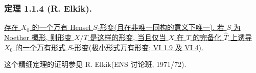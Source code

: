 \subsubsection*{定理 1.1.4 (R. Elkik).}
\underline{存在 $X_0$ 的一个万有 Hensel $S$-形变(且在非唯一同构的意义下唯一). 若 $S$ 为 Noether 概形, 则形变 $X/T$ 是这样的形变, 当且仅当 $X$ 在 $T$ 的完备化 $\widehat T$ 上诱导 $X_0$ 的一个万有形式 $S$-形变(极小形式万有形变; VI 1.9 及 VI 4).}

这个精细定理的证明参见 R. Elkik(ENS 讨论班, 1971/72).